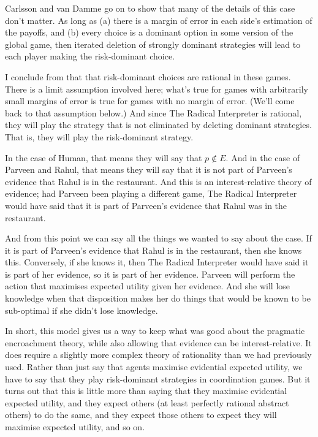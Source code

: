 Carlsson and van Damme go on to show that many of the details of this case don't matter. As long as (a) there is a margin of error in each side's estimation of the payoffs, and (b) every choice is a dominant option in some version of the global game, then iterated deletion of strongly dominant strategies will lead to each player making the risk-dominant choice.

I conclude from that that risk-dominant choices are rational in these games. There is a limit assumption involved here; what's true for games with arbitrarily small margins of error is true for games with no margin of error. (We'll come back to that assumption below.) And since The Radical Interpreter is rational, they will play the strategy that is not eliminated by deleting dominant strategies. That is, they will play the risk-dominant strategy. 

In the case of Human, that means they will say that $p \notin E$. And in the case of Parveen and Rahul, that means they will say that it is not part of Parveen's evidence that Rahul is in the restaurant. And this is an interest-relative theory of evidence; had Parveen been playing a different game, The Radical Interpreter would have said that it is part of Parveen's evidence that Rahul was in the restaurant. 

And from this point we can say all the things we wanted to say about the case. If it is part of Parveen's evidence that Rahul is in the restaurant, then she knows this. Conversely, if she knows it, then The Radical Interpreter would have said it is part of her evidence, so it is part of her evidence. Parveen will perform the action that maximises expected utility given her evidence. And she will lose knowledge when that disposition makes her do things that would be known to be sub-optimal if she didn't lose knowledge.

In short, this model gives us a way to keep what was good about the pragmatic encroachment theory, while also allowing that evidence can be interest-relative. It does require a slightly more complex theory of rationality than we had previously used. Rather than just say that agents maximise evidential expected utility, we have to say that they play risk-dominant strategies in coordination games. But it turns out that this is little more than saying that they maximise evidential expected utility, and they expect others (at least perfectly rational abstract others) to do the same, and they expect those others to expect they will maximise expected utility, and so on.


